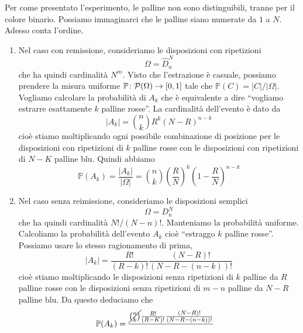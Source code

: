 \documentclass[a4paper]{article}
\begin{document}
\begin{snippetsolution}{}
    Per come presentato l'esperimento, le palline non sono distinguibili, tranne per il colore binario.
    Possiamo immaginarci che le palline siano numerate
    da \(1\) a \(N\). Adesso conta l'ordine.
    \begin{enumerate}
        \item Nel caso con remissione, consideriamo le disposizioni con ripetizioni
            \[
                \Omega = \hat D_n^N
            \]
            che ha quindi cardinalità \(N^m\).
            Visto che l'estrazione è casuale, possiamo prendere la misura uniforme
            \(\mathbb P \colon \mathcal P(\Omega) \to [0,1]\)
            tale che \(\mathbb P(C) = |C| / |\Omega|\).
            Vogliamo calcolare
            la probabilità di \(A_k\) che è equivalente a dire ``vogliamo estrarre esattamente \(k\) palline rosse''.
            La cardinalità dell'evento è dato da
            \[
                |A_k| = \binom{n}{k} R^k (N-R)^{n-k}
            \]
            cioè stiamo moltiplicando ogni possibile combinazione di posizione per le disposizioni
            con ripetizioni di \(k\) palline rosse con le disposizioni con ripetizioni di
            \(N-K\) palline blu.
            Quindi abbiamo
            \[
                \mathbb P(A_k) = \frac{|A_k|}{|\Omega|} = \binom{n}{k}
                \left(
                    \frac{R}{N}
                \right)^k
                \left(
                    1 - \frac{R}{N}
                \right)^{n-k}
            \]
        \item Nel caso senza reimissione, consideriamo le disposizioni semplici
            \[
                \Omega = D_n^N
            \]
            che ha quindi cardinalità \(N!/(N-n)!\).
            Manteniamo la probabilità uniforme.
            Calcoliamo la probabilità dell'evento
            \(A_k\) cioè ``estraggo \(k\) palline rosse''.
            Possiamo usare lo stesso ragionamento di prima,
            \[
                |A_k| = \frac{R!}{(R-k)!} \frac{(N-R)!}{(N-R-(n-k))!}
            \]
            cioè stiamo moltiplicando le disposizioni senza ripetizioni di \(k\)
            palline da \(R\) palline rosse con le disposizioni senza ripetizioni di \(m-n\)
            palline da \(N-R\) palline blu. Da questo deduciamo che
            \begin{align*}
                \mathbb P(A_k) &= \frac{
                    \cancel{\binom{n}{k}} \frac{R!}{(R-K)!}
                    \frac{(N-R)!}{(N-R-(n-k))!}
                }{
}
\end{align*}
\end{enumerate}
\end{snippetsolution}
\end{document}
